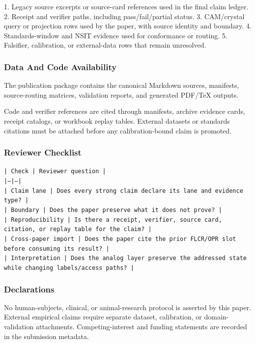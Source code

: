 \documentclass[11pt]{article}
\begin{document}
1. Legacy source excerpts or source-card references used in the final claim ledger.
2. Receipt and verifier paths, including pass/fail/partial status.
3. CAM/crystal query or projection rows used by the paper, with source identity and boundary.
4. Standards-window and NSIT evidence used for conformance or routing.
5. Falsifier, calibration, or external-data rows that remain unresolved.

\subsubsection*{Data And Code Availability}

The publication package contains the canonical Markdown sources, manifests, source-routing matrices, validation reports, and generated PDF/TeX outputs.

Code and verifier references are cited through manifests, archive evidence cards, receipt catalogs, or workbook replay tables. External datasets or
standards citations must be attached before any calibration-bound claim is
promoted.

\subsubsection*{Reviewer Checklist}

\noindent\texttt{| Check | Reviewer question |}\\
\noindent\texttt{|---|---|}\\
\noindent\texttt{| Claim lane | Does every strong claim declare its lane and evidence type? |}\\
\noindent\texttt{| Boundary | Does the paper preserve what it does not prove? |}\\
\noindent\texttt{| Reproducibility | Is there a receipt, verifier, source card, citation, or replay table for the claim? |}\\
\noindent\texttt{| Cross-paper import | Does the paper cite the prior FLCR/OPR slot before consuming its result? |}\\
\noindent\texttt{| Interpretation | Does the analog layer preserve the addressed state while changing labels/access paths? |}\\

\subsubsection*{Declarations}

No human-subjects, clinical, or animal-research protocol is asserted by this
paper. External empirical claims require separate dataset, calibration, or
domain-validation attachments. Competing-interest and funding statements are recorded in the submission metadata.
\end{document}
